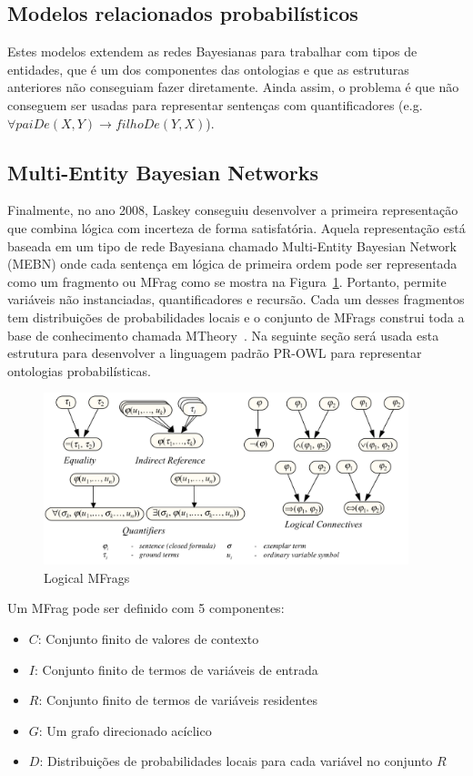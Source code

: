 \subsection{Modelos relacionados probabilísticos}
\label{subsec:prm}

Estes modelos extendem as redes Bayesianas para trabalhar com tipos de entidades, que é um dos componentes das ontologias e que as estruturas anteriores não conseguiam fazer diretamente. Ainda assim, o problema é que não conseguem ser usadas para representar sentenças com quantificadores (e.g. $\forall paiDe( X , Y ) \rightarrow filhoDe( Y , X )$).

\subsection{Multi-Entity Bayesian Networks}
\label{subsec:mebn}

Finalmente, no ano 2008, Laskey conseguiu desenvolver a primeira representação que combina lógica com incerteza de forma satisfatória. Aquela representação está baseada em um tipo de rede Bayesiana chamado Multi-Entity Bayesian Network (MEBN) onde cada sentença em lógica de primeira ordem pode ser representada como um fragmento ou MFrag como se mostra na Figura~\ref{fig:sentences}. Portanto, permite variáveis não instanciadas, quantificadores e recursão. Cada um desses fragmentos tem distribuições de probabilidades locais e o conjunto de MFrags construi toda a base de conhecimento chamada MTheory~\cite{Laskey08}. Na seguinte seção será usada esta estrutura para desenvolver a linguagem padrão PR-OWL para representar ontologias probabilísticas.

\begin{figure}
	\centering
	\includegraphics[height=5cm]{./images/sentences}
	\caption{Logical MFrags}
	\label{fig:sentences}
\end{figure}

Um MFrag pode ser definido com 5 componentes:
\begin{itemize}
	\item $C$: Conjunto finito de valores de contexto
	\item $I$: Conjunto finito de termos de variáveis de entrada
	\item $R$: Conjunto finito de termos de variáveis residentes
	\item $G$: Um grafo direcionado acíclico
	\item $D$: Distribuições de probabilidades locais para cada variável no conjunto $R$
\end{itemize}

